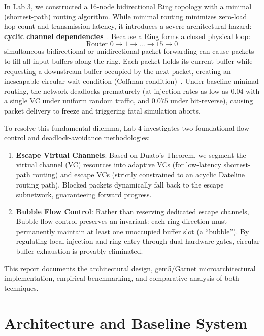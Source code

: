 \documentclass[10pt,journal,compsoc]{IEEEtran}
\begin{document}
In Lab 3, we constructed a 16-node bidirectional Ring topology with a minimal (shortest-path) routing algorithm. While minimal routing minimizes zero-load hop count and transmission latency, it introduces a severe architectural hazard: \textbf{cyclic channel dependencies}~\cite{dally1987deadlock}. Because a Ring forms a closed physical loop:
\begin{equation}
\text{Router } 0 \to 1 \to \dots \to 15 \to 0
\end{equation}
simultaneous bidirectional or unidirectional packet forwarding can cause packets to fill all input buffers along the ring. Each packet holds its current buffer while requesting a downstream buffer occupied by the next packet, creating an inescapable circular wait condition (Coffman condition)~\cite{coffman1971deadlock}. Under baseline minimal routing, the network deadlocks prematurely (at injection rates as low as $0.04$ with a single VC under uniform random traffic, and $0.075$ under bit-reverse), causing packet delivery to freeze and triggering fatal simulation aborts.

To resolve this fundamental dilemma, Lab 4 investigates two foundational flow-control and deadlock-avoidance methodologies:
\begin{enumerate}
    \item \textbf{Escape Virtual Channels}: Based on Duato's Theorem, we segment the virtual channel (VC) resources into adaptive VCs (for low-latency shortest-path routing) and escape VCs (strictly constrained to an acyclic Dateline routing path). Blocked packets dynamically fall back to the escape subnetwork, guaranteeing forward progress.
    \item \textbf{Bubble Flow Control}: Rather than reserving dedicated escape channels, Bubble flow control preserves an invariant: each ring direction must permanently maintain at least one unoccupied buffer slot (a ``bubble''). By regulating local injection and ring entry through dual hardware gates, circular buffer exhaustion is provably eliminated.
\end{enumerate}

This report documents the architectural design, gem5/Garnet microarchitectural implementation, empirical benchmarking, and comparative analysis of both techniques.

\section{Architecture and Baseline System}
\end{document}
